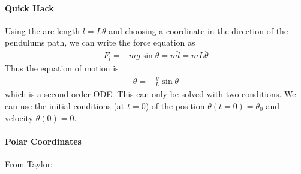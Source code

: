 \documentclass[../main.tex]{subfiles}
\begin{document}
\paragraph{Quick Hack} Using the arc length $l = L\theta$ and choosing a coordinate in the direction
of the pendulums path, we can write the force equation as
\begin{align*}
    F_l = -mg \sin\theta = m \ddot l = m L \ddot \theta
\end{align*}
Thus the equation of motion is
\begin{align*}
    \ddot \theta = -\frac{g}{L} \sin\theta
\end{align*}
which is a second order ODE. This can only be solved with two conditions. We can use the initial
conditions (at $t = 0$) of the position $\theta(t = 0) = \theta_0$ and velocity $\dot\theta(0) = 0$.

\paragraph{Polar Coordinates} From Taylor:
\end{document}
